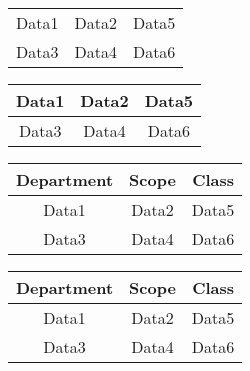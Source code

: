 \documentclass[10pt,a4paper]{article}
\begin{document}
\begin{center}
		
		\begin{tabular}{|c|c|c|}
			Data1 & Data2 & Data5 \\
			Data3 & Data4 & Data6 \\
		\end{tabular}	
		
		\vspace{0.5cm}
		
		
		
		\begin{tabular}{|c|c|c|}
			\hline
			Data1 & Data2 & Data5 \\ 
			\hline
			Data3 & Data4 & Data6 \\ \hline
		\end{tabular}	
		
		\vspace{0.5cm}
		
		
		
		\begin{tabular}{|c|c|c|}
			\hline
			\textbf{Department} & \textbf{Scope} & \textbf{Class} \\ 
			\hline
			Data1 & Data2 & Data5 \\ 
			\hline
			Data3 & Data4 & Data6 \\ \hline
		\end{tabular}	
		
		\vspace{0.5cm}
		
		
		
		\begin{tabular}{|c|c|c|}
			\hline
			\textbf{Department} & \textbf{Scope} & \textbf{Class} \\ \cline{1-3}
			\hline
			Data1 & Data2 & Data5 \\ 
			\hline
			Data3 & Data4 & Data6 \\ \hline
		\end{tabular}	
		

\end{center}
\end{document}
